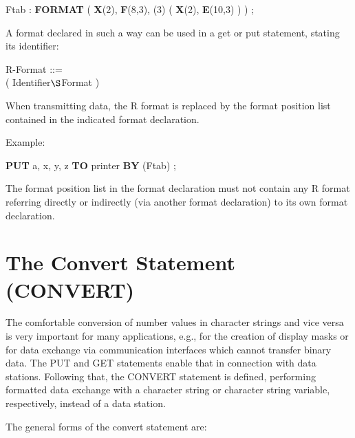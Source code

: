 Ftab : {\bf FORMAT} ( {\bf X}(2), {\bf F}(8,3), (3) ( {\bf X}(2), {\bf E}(10,3) ) ) ;

A format declared in such a way can be used in a get or put statement,
stating its identifier:

R-Format ::=\\
 ( Identifier$\S $Format )

When transmitting data, the R format is replaced by the format position
list contained in the indicated format declaration.

Example:

{\bf PUT} a, x, y, z {\bf TO} printer {\bf BY }(Ftab) ;

The format position list in the format declaration must not contain any
R format referring directly or indirectly (via another format
declaration) to its own format declaration.

\section{The Convert Statement (CONVERT)}   %
\label{sec_convert}

The comfortable conversion of number values in character strings and
vice versa is very important for many applications, e.g., for the
creation of display masks or for data exchange via communication
interfaces which cannot transfer binary data. The PUT and GET
statements enable that in connection with data stations. Following
that, the CONVERT statement is defined, performing formatted data
exchange with a character string or character string variable,
respectively, instead of a data station.

The general forms of the convert statement are:







